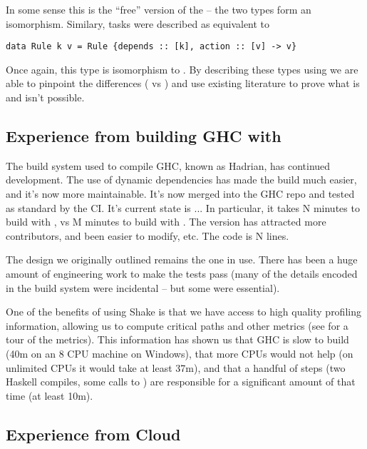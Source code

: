 In some sense this is the ``free'' version of the  -- the two types form an isomorphism. Similary, \Make tasks were described as equivalent to

\begin{verbatim}
data Rule k v = Rule {depends :: [k], action :: [v] -> v}
\end{verbatim}

Once again, this type is isomorphism to . By describing these types using  we are able to pinpoint the differences ( vs ) and use existing literature to prove what is and isn't possible.

\subsection{Experience from building GHC with \Shake}


The build system used to compile GHC, known as Hadrian, has continued development. The use of dynamic dependencies has made the build much easier, and it's now more maintainable. It's now merged into the GHC repo and tested as standard by the CI. It's current state is ... In particular, it takes N minutes to build with \Shake, vs M minutes to build with \Make. The \Shake version has attracted more contributors, and been easier to modify, etc. The code is N lines.

The design we originally outlined remains the one in use. There has been a huge amount of engineering work to make the tests pass (many of the details encoded in the \Make build system were incidental -- but some were essential).

One of the benefits of using Shake is that we have access to high quality profiling information, allowing us to compute critical paths and other metrics (see \cite{mitchell2019ghcrebuildtimes} for a tour of the metrics). This information has shown us that GHC is slow to build (40m on an 8 CPU machine on Windows), that more CPUs would not help (on unlimited CPUs it would take at least 37m), and that a handful of steps (two Haskell compiles, some calls to ) are responsible for a significant amount of that time (at least 10m).

\subsection{Experience from Cloud \Shake}\label{sec-cloud-shake}

